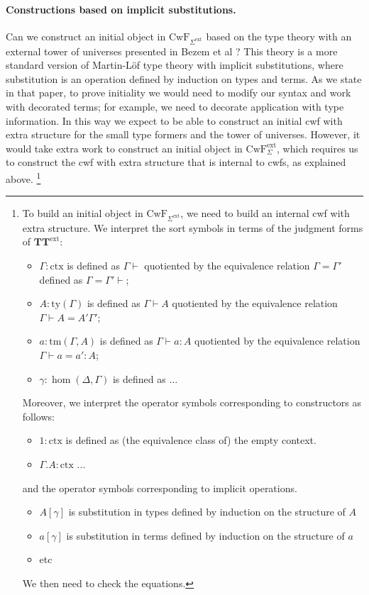 \documentclass[11pt,a4paper]{article}
\theoremstyle{definition}
\newcommand{\ctx}{\mathrm{ctx}}
\newcommand{\ty}{\mathrm{ty}}
\newcommand{\tm}{\mathrm{tm}}
\def\CwF{\mathrm{CwF}}
\def\Sigmaext{\Sigma^\mathrm{ext}}
\def\TText{\mathbf{TT}^\mathrm{ext}}
\begin{document}
\paragraph{Constructions based on implicit substitutions.} 
Can we construct an initial object in $\CwF_{\Sigmaext}$ based on the type theory with an external tower of universes presented in Bezem et al \cite{BezemCDE22}? This theory is a more standard version of Martin-Löf type theory with implicit substitutions, where substitution is an operation defined by induction on types and terms. As we state in that paper, to prove initiality we would need to modify our syntax and work with decorated terms; for example, we need to decorate application with type information. In this way we expect to be able to construct an initial cwf with extra structure for the small type formers and the tower of universes. However, it would take extra work to construct an initial object in $\CwF_\Sigmaext$, which requires us to construct the cwf with extra structure that is internal to cwfs, as explained above.
\footnote{To build an initial object in $\CwF_{\Sigmaext}$, we need to build an internal cwf with extra structure. We interpret the sort symbols in terms of the judgment forms of $\TText$:
\begin{itemize}
\item $\Gamma : \ctx$ is defined as $\Gamma \vdash$ quotiented by the equivalence relation $\Gamma = \Gamma'$ defined as $\Gamma = \Gamma' \vdash$;
\item $A : \ty(\Gamma)$ is defined as $\Gamma \vdash A$ quotiented by the equivalence relation $\Gamma \vdash A = A' \Gamma'$;
\item $a : \tm(\Gamma,A)$ is defined as $\Gamma \vdash a : A$ quotiented by the equivalence relation $\Gamma \vdash a = a' : A$;
\item $\gamma : \hom(\Delta,\Gamma)$ is defined as $\ldots$
\end{itemize}
Moreover, we interpret the operator symbols corresponding to constructors as follows:
\begin{itemize}
\item $ 1 : \ctx$ is defined as (the equivalence class of) the empty context.
\item $\Gamma.A : \ctx$ ...
\end{itemize}
and the operator symbols corresponding to implicit operations.
\begin{itemize}
\item $A[\gamma]$ is substitution in types defined by induction on the structure of $A$
\item $a[\gamma]$ is substitution in terms defined by induction on the structure of $a$
\item etc
\end{itemize}
We then need to check the equations.
}
\end{document}
